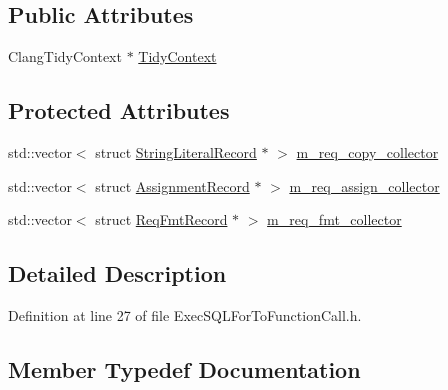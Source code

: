 \subsection*{Public Attributes}
\begin{DoxyCompactItemize}
\item 
Clang\+Tidy\+Context $\ast$ \hyperlink{classclang_1_1tidy_1_1pagesjaunes_1_1_exec_s_q_l_for_to_function_call_a47e2b3f6aa235ba2a53203de647ca3df}{Tidy\+Context}
\end{DoxyCompactItemize}
\subsection*{Protected Attributes}
\begin{DoxyCompactItemize}
\item 
std\+::vector$<$ struct \hyperlink{structclang_1_1tidy_1_1pagesjaunes_1_1_exec_s_q_l_for_to_function_call_1_1_string_literal_record}{String\+Literal\+Record} $\ast$ $>$ \hyperlink{classclang_1_1tidy_1_1pagesjaunes_1_1_exec_s_q_l_for_to_function_call_a4780c8e82224a601f298c3bc0f98d0c6}{m\+\_\+req\+\_\+copy\+\_\+collector}
\item 
std\+::vector$<$ struct \hyperlink{structclang_1_1tidy_1_1pagesjaunes_1_1_exec_s_q_l_for_to_function_call_1_1_assignment_record}{Assignment\+Record} $\ast$ $>$ \hyperlink{classclang_1_1tidy_1_1pagesjaunes_1_1_exec_s_q_l_for_to_function_call_aac106f303513d8d9ab765b6cdabbc064}{m\+\_\+req\+\_\+assign\+\_\+collector}
\item 
std\+::vector$<$ struct \hyperlink{structclang_1_1tidy_1_1pagesjaunes_1_1_exec_s_q_l_for_to_function_call_1_1_req_fmt_record}{Req\+Fmt\+Record} $\ast$ $>$ \hyperlink{classclang_1_1tidy_1_1pagesjaunes_1_1_exec_s_q_l_for_to_function_call_a5a54dd96dc985d0bc2f97a2d96e528a7}{m\+\_\+req\+\_\+fmt\+\_\+collector}
\end{DoxyCompactItemize}


\subsection{Detailed Description}


Definition at line 27 of file Exec\+S\+Q\+L\+For\+To\+Function\+Call.\+h.



\subsection{Member Typedef Documentation}
\mbox{\label{classclang_1_1tidy_1_1pagesjaunes_1_1_exec_s_q_l_for_to_function_call_a9ae5c1a41755645dea6218b2cad564ac}} 
